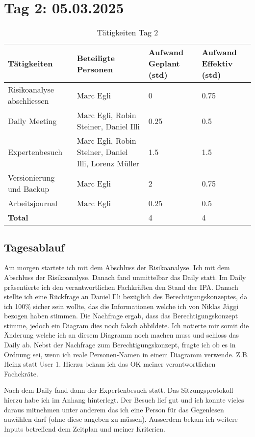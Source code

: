 \section{Tag 2: 05.03.2025}
\begin{table}[H]
    \begin{tabular}{|L{0.4\textwidth}|C{60pt}|C{60pt}|C{60pt}|}
        \hline
        \color{white}Tätigkeiten & \color{white}Beteiligte \color{white}Personen & \color{white}Aufwand Geplant (std) & \color{white}Aufwand Effektiv (std) \\
        \hline
         Risikoanalyse abschliessen & Marc Egli & 0 & 0.75 \\
         \hline
         Daily Meeting & Marc Egli, Robin Steiner, Daniel Illi & 0.25 & 0.5 \\
         \hline
         Expertenbesuch & Marc Egli, Robin Steiner, Daniel Illi, Lorenz Müller & 1.5 & 1.5 \\
         \hline
         Versionierung und Backup & Marc Egli & 2 & 0.75 \\
         \hline
         Arbeitsjournal & Marc Egli & 0.25 & 0.5 \\
        \hline
        \textbf{Total} &  & 4 & 4 \\
        \hline
    \end{tabular}
    \caption{Tätigkeiten Tag 2}
\end{table}

\subsection*{Tagesablauf}
Am morgen startete ich mit dem Abschluss der Risikoanalyse. Ich mit dem Abschluss der Risikoanalyse. Danach fand unmittelbar das Daily statt.
Im Daily präsentierte ich den verantwortlichen Fachkräften den Stand der IPA. Danach stellte ich eine Rückfrage an Daniel Illi bezüglich des Berechtigungskonzeptes, da
ich 100\% sicher sein wollte, das die Informationen welche ich von Niklas Jäggi bezogen haben stimmen. Die Nachfrage ergab, dass das Berechtigungskonzept stimme, jedoch ein Diagram
dies noch falsch abbildete. Ich notierte mir somit die Änderung welche ich an diesem Diagramm noch machen muss und schloss das Daily ab.
Nebst der Nachfrage zum Berechtigungskonzept, fragte ich ob es in Ordnung sei, wenn ich reale Personen-Namen in einem Diagramm verwende. Z.B. Heinz
statt User 1. Hierzu bekam ich das OK meiner verantwortlichen Fachckräte.

Nach dem Daily fand dann der Expertenbesuch statt. Das Sitzungsprotokoll hierzu habe ich im Anhang hinterlegt. Der Besuch lief gut und ich konnte vieles daraus mitnehmen
unter anderem das ich eine Person für das Gegenlesen auwählen darf (ohne diese angeben zu müssen). Ausserdem bekam ich weitere Inputs betreffend dem Zeitplan und meiner Kriterien.

